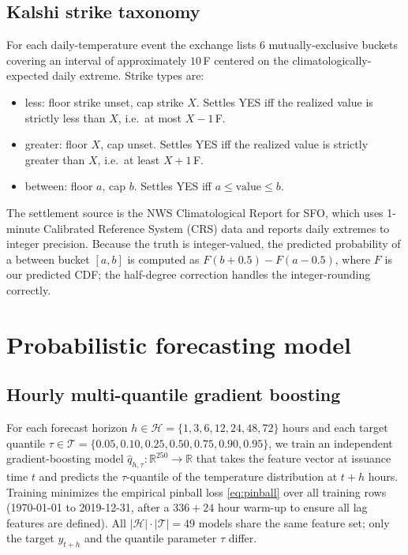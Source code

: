 \documentclass[11pt]{article}
\begin{document}
\subsection{Kalshi strike taxonomy}

For each daily-temperature event the exchange lists $6$ mutually-exclusive
buckets covering an interval of approximately $10$\,\textdegree F centered on
the climatologically-expected daily extreme. Strike types are:
\begin{itemize}[leftmargin=*,topsep=2pt,itemsep=2pt]
\item \textsf{less}: floor strike unset, cap strike $X$. Settles YES iff
the realized value is strictly less than $X$, i.e.\ at most $X-1$\,\textdegree F.
\item \textsf{greater}: floor $X$, cap unset. Settles YES iff the realized
value is strictly greater than $X$, i.e.\ at least $X+1$\,\textdegree F.
\item \textsf{between}: floor $a$, cap $b$. Settles YES iff $a \le \text{value} \le b$.
\end{itemize}
The settlement source is the NWS Climatological Report for SFO, which uses
1-minute Calibrated Reference System (CRS) data and reports daily extremes
to integer precision. Because the truth is integer-valued, the predicted
probability of a \textsf{between} bucket $[a,b]$ is computed as
$F(b+0.5) - F(a-0.5)$, where $F$ is our predicted CDF; the half-degree
correction handles the integer-rounding correctly.

\section{Probabilistic forecasting model}
\label{sec:model}

\subsection{Hourly multi-quantile gradient boosting}

For each forecast horizon $h \in \mathcal{H} = \{1, 3, 6, 12, 24, 48, 72\}$
hours and each target quantile $\tau \in \mathcal{T} = \{0.05, 0.10, 0.25,
0.50, 0.75, 0.90, 0.95\}$, we train an independent gradient-boosting model
$\hat{q}_{h,\tau}: \mathbb{R}^{250} \to \mathbb{R}$ that takes the
feature vector at issuance time $t$ and predicts the $\tau$-quantile of
the temperature distribution at $t + h$ hours. Training minimizes the
empirical pinball loss \eqref{eq:pinball} over all training rows
(1970-01-01 to 2019-12-31, after a $336+24$ hour warm-up to ensure all
lag features are defined). All $|\mathcal{H}| \cdot |\mathcal{T}| = 49$
models share the same feature set; only the target $y_{t+h}$ and the
quantile parameter $\tau$ differ.
\end{document}

